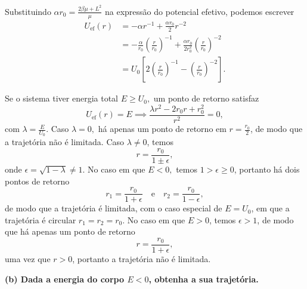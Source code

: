 Substituindo \(\alpha r_0 = \frac{2\beta \mu + L^2}{\mu}\) na expressão do potencial efetivo, podemos escrever
\begin{align}
    U_\mathrm{ef}(r) &= -\alpha r^{-1} + \frac{\alpha r_0}{2}r^{-2}\\
                     &= -\frac{\alpha}{r_0} \left(\frac{r}{r_0}\right)^{-1} + \frac{\alpha r_0}{2r_0^2}\left(\frac{r}{r_0}\right)^{-2}\\
                     &= U_0\left[2\left(\frac{r}{r_0}\right)^{-1} - \left(\frac{r}{r_0}\right)^{-2}\right].
\end{align}

Se o sistema tiver energia total \(E \geq U_0,\) um ponto de retorno satisfaz
\begin{equation}
    U_\mathrm{ef}(r) = E \implies \frac{\lambda r^2 - 2r_0 r + r_0^2}{r^2} = 0,
\end{equation}
com \(\lambda = \frac{E}{U_0}.\) Caso \(\lambda = 0,\) há apenas um ponto de retorno em \(r = \frac{r_0}{2}\), de modo que a trajetória não é limitada. Caso \(\lambda \neq 0\), temos
\begin{equation}
    r = \frac{r_0}{1 \pm \epsilon},
\end{equation}
onde \(\epsilon = \sqrt{1 - \lambda} \neq 1\). No caso em que \(E < 0,\) temos \(1 > \epsilon \geq 0\), portanto há dois pontos de retorno
\begin{equation}
    r_1 = \frac{r_0}{1+\epsilon}\quad\text{e}\quad r_2 = \frac{r_0}{1 - \epsilon},
\end{equation}
de modo que a trajetória é limitada, com o caso especial de \(E = U_0\), em que a trajetória é circular \(r_1 = r_2 = r_0\). No caso em que \(E > 0\), temos \(\epsilon > 1\), de modo que há apenas um ponto de retorno
\begin{equation}
    r = \frac{r_0}{1+\epsilon},
\end{equation}
uma vez que \(r > 0\), portanto a trajetória não é limitada.

\textbf{(b) Dada a energia do corpo \(E < 0\), obtenha a sua trajetória.}

